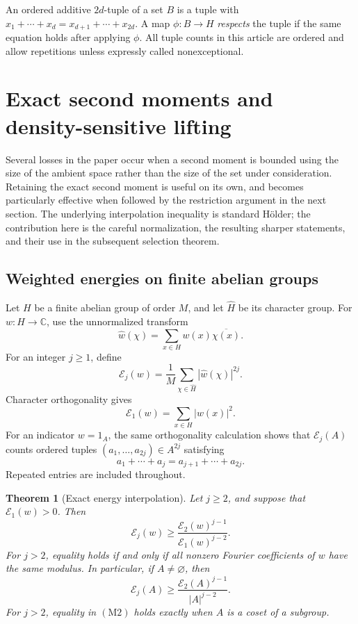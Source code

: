 \documentclass[11pt,letterpaper]{article}
\numberwithin{equation}{section}
\newtheorem{theorem}{Theorem}[section]
\theoremstyle{definition}
\theoremstyle{remark}
\newcommand{\C}{\mathbb C}
\newcommand{\1}{\mathbf 1}
\newcommand{\abs}[1]{\left|#1\right|}
\newcommand{\srctag}[1]{\texorpdfstring{\enspace\textup{[#1]}}{ [#1]}}
\newcommand{\srcnote}[2]{\par\noindent{\small\textit{Source #1, delivered #2.}}\par}
\begin{document}
An ordered additive \(2d\)-tuple of a set \(B\) is a tuple with
\(x_1+\cdots+x_d=x_{d+1}+\cdots+x_{2d}\).
A map \(\phi:B\to H\) \emph{respects} the tuple if the same equation holds
after applying \(\phi\).  All tuple counts in this article are ordered
and allow repetitions unless expressly called nonexceptional.



\section[{Exact second moments and density-sensitive lifting\srctag{04}}]{Exact second moments and density-sensitive lifting}\label{gsr:en:04:sec:d3}
\srcnote{04}{Section 3}
\label{gsr:en:04:mom:section}

Several losses in the paper occur when a second moment is bounded using
the size of the ambient space rather than the size of the set under
consideration.  Retaining the exact second moment is useful on its own,
and becomes particularly effective when followed by the restriction
argument in the next section.  The underlying interpolation inequality
is standard H\"older; the contribution here is the careful normalization,
the resulting sharper statements, and their use in the subsequent
selection theorem.

\subsection{Weighted energies on finite abelian groups}

Let \(H\) be a finite abelian group of order \(M\), and let
\(\widehat H\) be its character group.  For \(w:H\to\C\), use the
unnormalized transform
\[
 \widehat w(\chi)=\sum_{x\in H}w(x)\overline{\chi(x)}.
\]
For an integer \(j\geq1\), define
\[
 \mathcal E_j(w)=\frac1M\sum_{\chi\in\widehat H}
                       \abs{\widehat w(\chi)}^{2j}.
\]
Character orthogonality gives
\[
 \mathcal E_1(w)=\sum_{x\in H}\abs{w(x)}^2.
\]
For an indicator \(w=1_A\), the same orthogonality calculation shows
that \(\mathcal E_j(A)\) counts ordered tuples
\((a_1,\ldots,a_{2j})\in A^{2j}\) satisfying
\[
 a_1+\cdots+a_j=a_{j+1}+\cdots+a_{2j}.
\]
Repeated entries are included throughout.

\begin{theorem}[Exact energy interpolation]
\label{gsr:en:04:mom:interpolation}
Let \(j\geq2\), and suppose that \(\mathcal E_1(w)>0\).  Then
\[
 \boxed{\quad
 \mathcal E_j(w)\geq
 \frac{\mathcal E_2(w)^{j-1}}{\mathcal E_1(w)^{j-2}}.
 \quad}
 \tag{M1}
\]
For \(j>2\), equality holds if and only if all nonzero Fourier
coefficients of \(w\) have the same modulus.  In particular, if
\(A\ne\varnothing\), then
\[
 \mathcal E_j(A)\geq
 \frac{\mathcal E_2(A)^{j-1}}{\abs A^{j-2}}.
 \tag{M2}
\]
For \(j>2\), equality in \(\mathrm{(M2)}\) holds exactly when \(A\)
is a coset of a subgroup.
\end{theorem}
\end{document}
